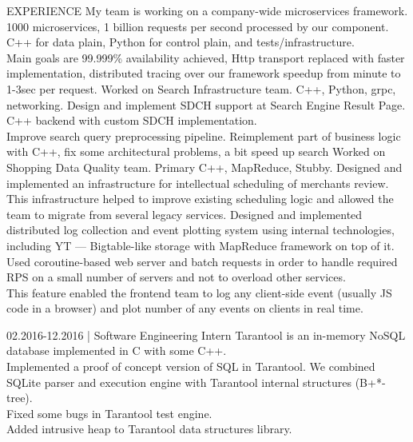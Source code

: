 \documentclass[12pt]{cutecv}
\begin{document}
\begin{paracol}{2}
\begin{leftcolumn}
\end{leftcolumn}

\begin{rightcolumn}
\begin{cvsection}{EXPERIENCE}
  {My team is working on a company-wide microservices framework. 1000 microservices, 1 billion requests per second processed by our component.\\
  C++ for data plain, Python for control plain, and tests/infrastructure.\\
  Main goals are 99.999\% availability achieved, Http transport replaced with faster
  implementation, distributed tracing over our framework speedup from minute to 1-3sec per request.}
  {Worked on Search Infrastructure team. C++, Python, grpc, networking.
  Design and implement SDCH support at Search Engine Result Page.
  C++ backend with custom SDCH implementation.\\
  Improve search query preprocessing pipeline. Reimplement part of business logic with C++, fix some architectural problems, a bit speed up search}
  {Worked on Shopping Data Quality team. Primary C++, MapReduce, Stubby.
   Designed and implemented an infrastructure for intellectual scheduling of merchants review. This infrastructure helped to improve existing scheduling logic
   and allowed the team to migrate from several legacy services.}
  {Designed and implemented distributed log collection and event
   plotting system using internal technologies, including YT — Bigtable-like
   storage with MapReduce framework on top of it. \\
   Used coroutine-based web server and batch requests in order
   to handle required RPS on a small number of servers and not to overload
   other services. \\
   This feature enabled the frontend team to log any client-side
   event (usually JS code in a browser) and plot number of any events on
   clients in real time.}

  {02.2016-12.2016 | Software Engineering Intern}
  {Tarantool is an in-memory NoSQL database implemented in C with some C++.\\
   Implemented a proof of concept version of SQL in Tarantool.
   We combined SQLite parser and execution engine with Tarantool internal structures (B+*-tree).\\
   Fixed some bugs in Tarantool test engine.\\
   Added intrusive heap to Tarantool data structures library.}
\end{cvsection}


\end{rightcolumn}
\end{paracol}
\end{document}
